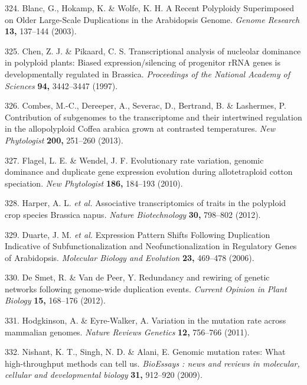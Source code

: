 \documentclass[12pt,]{book}
\begin{document}
\hypertarget{ref-blanc_recent_2003}{}
324. Blanc, G., Hokamp, K. \& Wolfe, K. H. A Recent Polyploidy
Superimposed on Older Large-Scale Duplications in the Arabidopsis
Genome. \emph{Genome Research} \textbf{13,} 137--144 (2003).

\hypertarget{ref-chen_transcriptional_1997}{}
325. Chen, Z. J. \& Pikaard, C. S. Transcriptional analysis of nucleolar
dominance in polyploid plants: Biased expression/silencing of progenitor
rRNA genes is developmentally regulated in Brassica. \emph{Proceedings
of the National Academy of Sciences} \textbf{94,} 3442--3447 (1997).

\hypertarget{ref-combes_contribution_2013}{}
326. Combes, M.-C., Dereeper, A., Severac, D., Bertrand, B. \&
Lashermes, P. Contribution of subgenomes to the transcriptome and their
intertwined regulation in the allopolyploid Coffea arabica grown at
contrasted temperatures. \emph{New Phytologist} \textbf{200,} 251--260
(2013).

\hypertarget{ref-flagel_evolutionary_2010}{}
327. Flagel, L. E. \& Wendel, J. F. Evolutionary rate variation, genomic
dominance and duplicate gene expression evolution during allotetraploid
cotton speciation. \emph{New Phytologist} \textbf{186,} 184--193 (2010).

\hypertarget{ref-harper_associative_2012}{}
328. Harper, A. L. \emph{et al.} Associative transcriptomics of traits
in the polyploid crop species Brassica napus. \emph{Nature
Biotechnology} \textbf{30,} 798--802 (2012).

\hypertarget{ref-duarte_expression_2006}{}
329. Duarte, J. M. \emph{et al.} Expression Pattern Shifts Following
Duplication Indicative of Subfunctionalization and Neofunctionalization
in Regulatory Genes of Arabidopsis. \emph{Molecular Biology and
Evolution} \textbf{23,} 469--478 (2006).

\hypertarget{ref-de_smet_redundancy_2012}{}
330. De Smet, R. \& Van de Peer, Y. Redundancy and rewiring of genetic
networks following genome-wide duplication events. \emph{Current Opinion
in Plant Biology} \textbf{15,} 168--176 (2012).

\hypertarget{ref-hodgkinson_variation_2011}{}
331. Hodgkinson, A. \& Eyre-Walker, A. Variation in the mutation rate
across mammalian genomes. \emph{Nature Reviews Genetics} \textbf{12,}
756--766 (2011).

\hypertarget{ref-nishant_genomic_2009}{}
332. Nishant, K. T., Singh, N. D. \& Alani, E. Genomic mutation rates:
What high-throughput methods can tell us. \emph{BioEssays : news and
reviews in molecular, cellular and developmental biology} \textbf{31,}
912--920 (2009).
\end{document}
